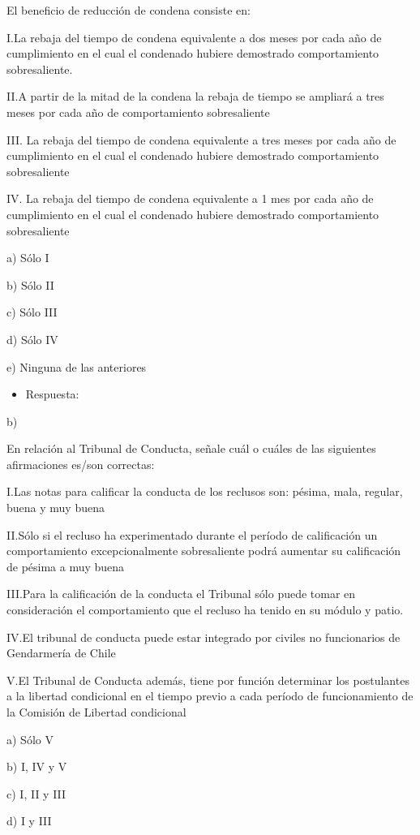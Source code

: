 \documentclass[letterpaper, 11pt]{article}
\begin{document}
El beneficio de reducción de condena consiste en:

I.La rebaja del tiempo de condena equivalente a dos meses por cada año de
cumplimiento en el cual el condenado hubiere demostrado comportamiento
sobresaliente.

II.A partir de la mitad de la condena la rebaja de tiempo se ampliará a
tres meses por cada año de comportamiento sobresaliente

III. La rebaja del tiempo de condena equivalente a tres meses por cada año de
cumplimiento en el cual el condenado hubiere demostrado comportamiento
sobresaliente

IV. La rebaja del tiempo de condena equivalente a 1 mes por cada año de
cumplimiento en el cual el condenado hubiere demostrado comportamiento
sobresaliente

a) Sólo I

b) Sólo II

c) Sólo III

d) Sólo IV

e) Ninguna de las anteriores

\begin{itemize}
\item Respuesta:
\end{itemize}
b)


En relación al Tribunal de Conducta, señale cuál o cuáles de las siguientes
afirmaciones es/son correctas:

I.Las notas para calificar la conducta de los reclusos son: pésima, mala, regular,
buena y muy buena

II.Sólo si el recluso ha experimentado durante el período de calificación un
comportamiento excepcionalmente sobresaliente podrá aumentar su calificación
de pésima a muy buena

III.Para la calificación de la conducta el Tribunal sólo puede tomar en consideración el
comportamiento que el recluso ha tenido en su módulo y patio.

IV.El tribunal de conducta puede estar integrado por civiles no funcionarios de
Gendarmería de Chile

V.El Tribunal de Conducta además, tiene por función determinar los postulantes a la
libertad condicional en el tiempo previo a cada período de funcionamiento de la
Comisión de Libertad condicional

a) Sólo V

b) I, IV y V

c) I, II y III

d) I y III
\end{document}
